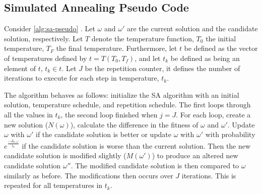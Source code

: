 \documentclass[11pt,a4paper,final]{article}
\begin{document}
\subsection{Simulated Annealing Pseudo Code}
\label{sec:simulated-annealing-pseudo-code}
Consider \ref{alg:sa-pseudo} \cite{henderson-1989-theor-pract}. Let \(\omega\) and \(\omega'\) are the current solution and the
candidate solution, respectively. Let \(T\) denote the temperature function, \(T_0\) the initial temperature, \(T_F\) the
final temperature. Furthermore, let \(t\) be defined as the vector of temperatures defined by \(t = T(T_0, T_f)\), and let
\(t_k\) be defined as being an element of \(t\), \(t_k \in t\). Let \(J\) be the repetition counter, it defines the number of
iterations to execute for each step in temperature, \(t_k\).

The algorithm behaves as follows: initialize the SA algorithm with an initial solution, temperature schedule, and
repetition schedule. The first loops through all the values in \(t_k\), the second loop finished when \(j = J\). For each
loop, create a new solution (\(N(\omega)\)), calculate the difference in the fitness of \(\omega\) and \(\omega'\). Update \(\omega\) with \(\omega'\) if
the candidate solution is better or update \(\omega\) with \(\omega'\) with probability \(e^{\frac{-\Delta_{\omega , \omega'}}{t_k}}\) if the candidate
solution is worse than the current solution. Then the new candidate solution is modified slightly (\(M(\omega')\)) to produce
an altered new candidate solution \(\omega{''}\). The modified candidate solution is then compared to \(\omega\) similarly as before.
The modifications then occurs over \(J\) iterations. This is repeated for all temperatures in \(t_k\).
\end{document}
